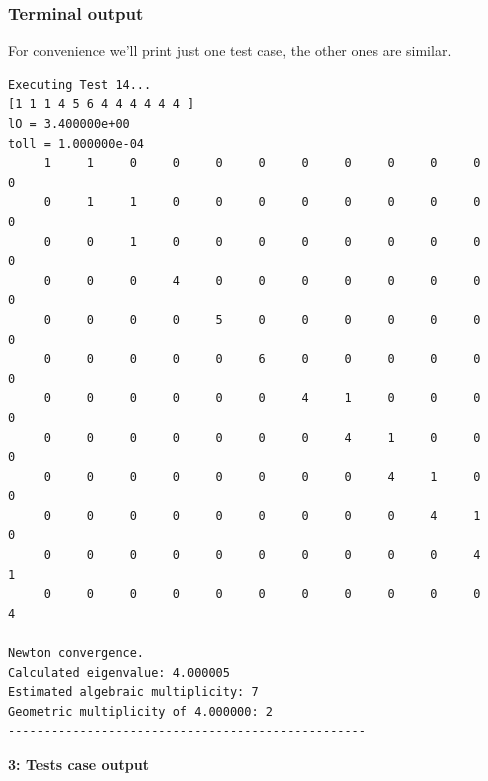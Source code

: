 \documentclass[12pt]{article}
\begin{document}
\subsubsection{Terminal output}
For convenience we'll print just one test case, the other ones are similar.
    \begin{framed}
    \begin{verbatim}
Executing Test 14...
[1 1 1 4 5 6 4 4 4 4 4 4 ]
lO = 3.400000e+00
toll = 1.000000e-04
     1     1     0     0     0     0     0     0     0     0     0     0
     0     1     1     0     0     0     0     0     0     0     0     0
     0     0     1     0     0     0     0     0     0     0     0     0
     0     0     0     4     0     0     0     0     0     0     0     0
     0     0     0     0     5     0     0     0     0     0     0     0
     0     0     0     0     0     6     0     0     0     0     0     0
     0     0     0     0     0     0     4     1     0     0     0     0
     0     0     0     0     0     0     0     4     1     0     0     0
     0     0     0     0     0     0     0     0     4     1     0     0
     0     0     0     0     0     0     0     0     0     4     1     0
     0     0     0     0     0     0     0     0     0     0     4     1
     0     0     0     0     0     0     0     0     0     0     0     4
        
Newton convergence.
Calculated eigenvalue: 4.000005
Estimated algebraic multiplicity: 7
Geometric multiplicity of 4.000000: 2
--------------------------------------------------
    \end{verbatim}
    \end{framed}
    \begin{center}
        \textbf{3: Tests case output}
    \end{center}
    \newpage
\end{document}

